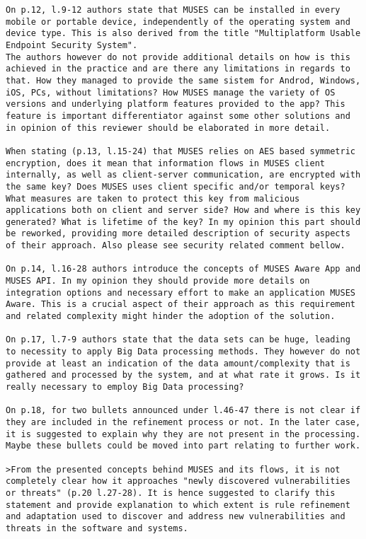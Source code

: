 \documentclass[preprint]{elsarticle}
\begin{document}
\begin{verbatim}
On p.12, l.9-12 authors state that MUSES can be installed in every mobile or portable device, independently of the operating system and device type. This is also derived from the title "Multiplatform Usable Endpoint Security System".
The authors however do not provide additional details on how is this achieved in the practice and are there any limitations in regards to that. How they managed to provide the same sistem for Androd, Windows, iOS, PCs, without limitations? How MUSES manage the variety of OS versions and underlying platform features provided to the app? This feature is important differentiator against some other solutions and in opinion of this reviewer should be elaborated in more detail.

When stating (p.13, l.15-24) that MUSES relies on AES based symmetric encryption, does it mean that information flows in MUSES client internally, as well as client-server communication, are encrypted with the same key? Does MUSES uses client specific and/or temporal keys? What measures are taken to protect this key from malicious applications both on client and server side? How and where is this key generated? What is lifetime of the key? In my opinion this part should be reworked, providing more detailed description of security aspects of their approach. Also please see security related comment bellow.

On p.14, l.16-28 authors introduce the concepts of MUSES Aware App and MUSES API. In my opinion they should provide more details on integration options and necessary effort to make an application MUSES Aware. This is a crucial aspect of their approach as this requirement and related complexity might hinder the adoption of the solution.

On p.17, l.7-9 authors state that the data sets can be huge, leading to necessity to apply Big Data processing methods. They however do not provide at least an indication of the data amount/complexity that is gathered and processed by the system, and at what rate it grows. Is it really necessary to employ Big Data processing?

On p.18, for two bullets announced under l.46-47 there is not clear if they are included in the refinement process or not. In the later case, it is suggested to explain why they are not present in the processing. Maybe these bullets could be moved into part relating to further work.

>From the presented concepts behind MUSES and its flows, it is not completely clear how it approaches "newly discovered vulnerabilities or threats" (p.20 l.27-28). It is hence suggested to clarify this statement and provide explanation to which extent is rule refinement and adaptation used to discover and address new vulnerabilities and threats in the software and systems.


\end{verbatim}
\end{document}
